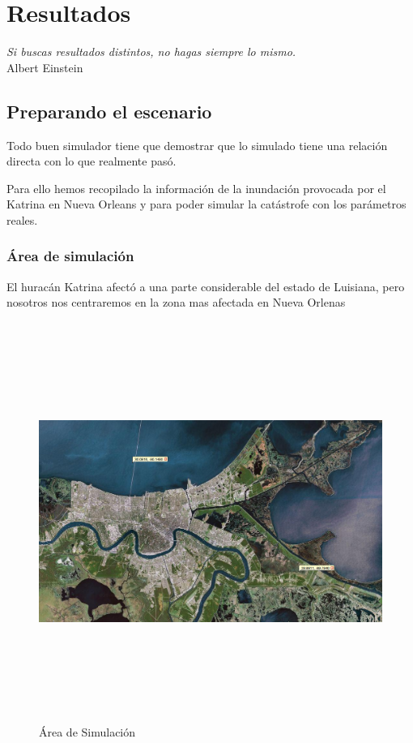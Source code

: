 
\chapter*{Resultados} \label{cap6}

\begin{flushright}
\begin{minipage}{7.85cm}
    {\em Si buscas resultados distintos, no hagas siempre lo mismo.} \\ Albert
    Einstein
\end{minipage}
\end{flushright}

\vspace*{5mm}

\section*{Preparando el escenario}

Todo buen simulador tiene que demostrar que lo simulado tiene una relación
directa con lo que realmente pasó.

Para ello hemos recopilado la información de la inundación provocada por el
Katrina en Nueva Orleans y para poder simular la catástrofe con los parámetros
reales.

\subsection*{Área de simulación}

El huracán Katrina afectó a una parte considerable del estado de Luisiana, pero
nosotros nos centraremos en la zona mas afectada en Nueva Orlenas

\begin{figure}[H]
 \centering
 \includegraphics[height=130mm,angle=90]{figuras/cap6/NOarea1.png}
 \caption{Área de Simulación}
\end{figure}

